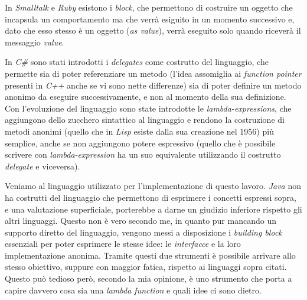 In \emph{Smalltalk} e \emph{Ruby} esistono i \emph{block}, che
permettono di costruire un oggetto che incapsula un comportamento ma
che verr\`a esiguito in un momento successivo e, dato che esso stesso
\`e un oggetto (\emph{as value}), verr\`a eseguito solo quando
ricever\`a il messaggio \emph{value}.

In \emph{C\#} sono stati introdotti i \emph{delegates} come costrutto
del linguaggio, che permette sia di poter referenziare un metodo
(l'idea assomiglia ai \emph{function pointer} presenti in \emph{C++}
anche se vi sono nette differenze) sia di poter definire un metodo
anonimo da eseguire successivamente, e non al momento della sua
definizione. Con l'evoluzione del linguaggio sono state introdotte le
\emph{lambda-expressions}, che aggiungono dello zucchero sintattico al
linguaggio e rendono la costruzione di metodi anonimi (quello che in
\emph{Lisp} esiste dalla sua creazione nel 1956) pi\`u semplice, anche
se non aggiungono potere espressivo (quello che \`e possibile scrivere
con \emph{lambda-expression} ha un suo equivalente utilizzando il
costrutto \emph{delegate} e viceversa).

Veniamo al linguaggio utilizzato per l'implementazione di questo
lavoro. \emph{Java} non ha costrutti del linguaggio che permettono di
esprimere i concetti espressi sopra, e una valutazione superficiale,
porterebbe a darne un giudizio inferiore rispetto gli altri
linguaggi. Questo non \`e vero secondo me, in quanto pur mancando un
supporto diretto del linguaggio, vengono messi a disposizione i
\emph{building block} essenziali per poter esprimere le stesse idee:
le \emph{interfacce} e la loro implementazione anonima. Tramite questi
due strumenti \`e possibile arrivare allo stesso obiettivo, suppure
con maggior fatica, rispetto ai linguaggi sopra citati. Questo pu\`o
tedioso per\`o, secondo la mia opinione, \`e uno strumento che porta a
capire davvero cosa sia una \emph{lambda function} e quali idee ci
sono dietro.

